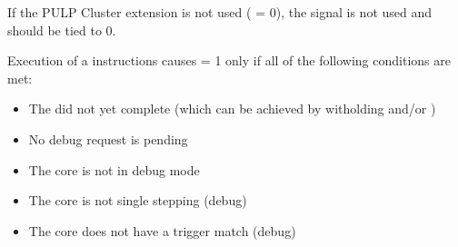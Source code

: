 \documentclass[letterpaper,10pt,english]{sphinxmanual}
\begin{document}
\sphinxAtStartPar
If the PULP Cluster extension is not used ( = 0), the  signal is not used and should be tied to 0.

\sphinxAtStartPar
Execution of a  instructions causes  = 1 only if all of the following conditions are met:
\begin{itemize}
\item {} 
\sphinxAtStartPar
The  did not yet complete (which can be achieved by witholding  and/or )

\item {} 
\sphinxAtStartPar
No debug request is pending

\item {} 
\sphinxAtStartPar
The core is not in debug mode

\item {} 
\sphinxAtStartPar
The core is not single stepping (debug)

\item {} 
\sphinxAtStartPar
The core does not have a trigger match (debug)

\end{itemize}
\end{document}
